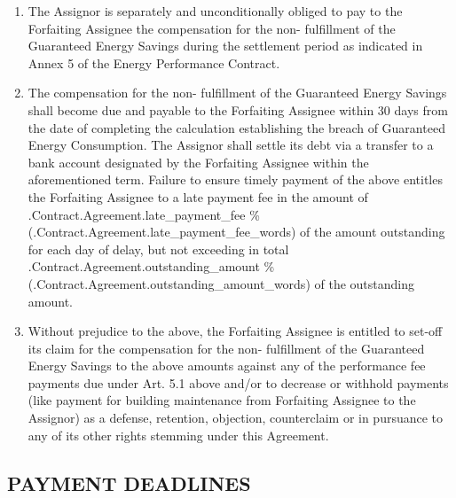 \documentclass[a4paper]{article}
\begin{document}
\begin{enumerate}
\item{The Assignor is separately and unconditionally obliged to pay to
    the Forfaiting Assignee the compensation for the non{-}
    fulfillment of the Guaranteed Energy Savings during the settlement
    period as indicated in Annex 5 of the Energy Performance
    Contract.}

\item{The compensation for the non{-} fulfillment of the Guaranteed
    Energy Savings shall become due and payable to the Forfaiting
    Assignee within 30 days from the date of completing the
    calculation establishing the breach of Guaranteed Energy
    Consumption. The Assignor shall settle its debt via a transfer to
    a bank account designated by the Forfaiting Assignee within the
    aforementioned term. Failure to ensure timely payment of the above
    entitles the Forfaiting Assignee to a late payment fee in the
    amount of \iffalse input forfaitingFields.late_payment_fee value="{{.Contract.Agreement.late_payment_fee}}" type="number" \fi {{.Contract.Agreement.late_payment_fee}} \%
    (\iffalse input forfaitingFields.late_payment_fee_words value="{{.Contract.Agreement.late_payment_fee_words}}" \fi {{.Contract.Agreement.late_payment_fee_words}}) of the amount
    outstanding for each day of delay, but not exceeding in total \iffalse input forfaitingFields.outstanding_amount value="{{.Contract.Agreement.outstanding_amount}}" type="number" \fi {{.Contract.Agreement.outstanding_amount}}
    \%(\iffalse input forfaitingFields.outstanding_amount_words value="{{.Contract.Agreement.outstanding_amount_words}}" \fi {{.Contract.Agreement.outstanding_amount_words}}) of the outstanding amount.}

\item{Without prejudice to the above, the Forfaiting Assignee is
    entitled to set{-}off its claim for the compensation for the
    non{-} fulfillment of the Guaranteed Energy Savings to the above
    amounts against any of the performance fee payments due under
    Art. 5.1 above and/or to decrease or withhold payments (like
    payment for building maintenance from Forfaiting Assignee to the
    Assignor) as a defense, retention, objection, counterclaim or in
    pursuance to any of its other rights stemming under this
    Agreement.}
\end{enumerate}

\subsection{PAYMENT DEADLINES}
\end{document}
